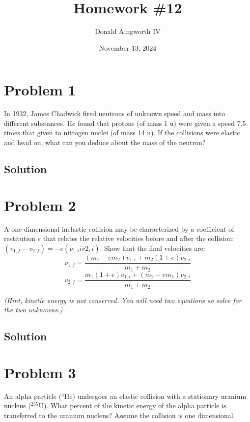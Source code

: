 \documentclass[12pt]{article}
\title{Homework \#12}
\author{Donald Aingworth IV}
\date{November 13, 2024}
\begin{document}

\maketitle

\pagebreak

\section*{Problem 1}
In 1932, James Chadwick fired neutrons of unknown speed and mass into different
substances. He found that protons (of mass 1 u) were given a speed 7.5 times that given to
nitrogen nuclei (of mass 14 u). If the collisions were elastic and head on, what can you deduce
about the mass of the neutron?

\subsection*{Solution}


\pagebreak
\section*{Problem 2}
A one-dimensional inelastic collision may be characterized by a coefficient of restitution $e$ that relates the relative velocities before and after the collision: $(v_{1,f} - v_{2,f}) = -e(v_{1,i} i v{2,i})$. Show that the final velocities are:
\[ v_{1,f} = \frac{(m_1 - em_2)v_{1,i} + m_2(1 + e)v_{2,i}}{m_1 + m_2} \]
\[ v_{2,f} = \frac{m_1(1 + e)v_{1,i} + (m_2 - em_1)v_{2,i}}{m_1 + m_2} \]

\textit{(Hint, kinetic energy is not conserved. You will need two equations so solve for the two
unknowns.)}
\subsection*{Solution}


\pagebreak
\section*{Problem 3}
An alpha particle ($^4$He) undergoes an elastic collision with a stationary uranium nucleus ($^{235}$U). What
percent of the kinetic energy of the alpha particle is transferred to the uranium nucleus? Assume the
collision is one dimensional.
\end{document}
